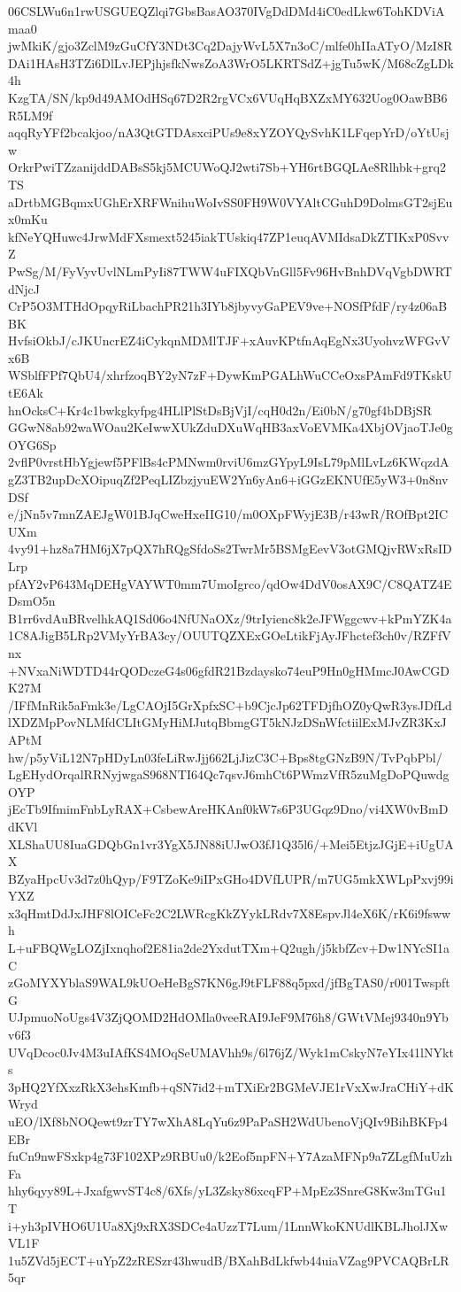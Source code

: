 06CSLWu6n1rwUSGUEQZlqi7GbsBasAO370IVgDdDMd4iC0edLkw6TohKDViAmaa0
jwMkiK/gjo3ZclM9zGuCfY3NDt3Cq2DajyWvL5X7n3oC/mlfe0hIIaATyO/MzI8R
DAi1HAsH3TZi6DlLvJEPjhjsfkNwsZoA3WrO5LKRTSdZ+jgTu5wK/M68cZgLDk4h
KzgTA/SN/kp9d49AMOdHSq67D2R2rgVCx6VUqHqBXZxMY632Uog0OawBB6R5LM9f
aqqRyYFf2bcakjoo/nA3QtGTDAsxciPUs9e8xYZOYQySvhK1LFqepYrD/oYtUsjw
OrkrPwiTZzanijddDABsS5kj5MCUWoQJ2wti7Sb+YH6rtBGQLAe8Rlhbk+grq2TS
aDrtbMGBqmxUGhErXRFWnihuWoIvSS0FH9W0VYAltCGuhD9DolmsGT2sjEux0mKu
kfNeYQHuwc4JrwMdFXsmext5245iakTUskiq47ZP1euqAVMIdsaDkZTIKxP0SvvZ
PwSg/M/FyVyvUvlNLmPyIi87TWW4uFIXQbVnGll5Fv96HvBnhDVqVgbDWRTdNjcJ
CrP5O3MTHdOpqyRiLbachPR21h3IYb8jbyvyGaPEV9ve+NOSfPfdF/ry4z06aBBK
HvfsiOkbJ/cJKUncrEZ4iCykqnMDMlTJF+xAuvKPtfnAqEgNx3UyohvzWFGvVx6B
WSblfFPf7QbU4/xhrfzoqBY2yN7zF+DywKmPGALhWuCCeOxsPAmFd9TKskUtE6Ak
hnOcksC+Kr4c1bwkgkyfpg4HLlPlStDsBjVjI/cqH0d2n/Ei0bN/g70gf4bDBjSR
GGwN8ab92waWOau2KeIwwXUkZduDXuWqHB3axVoEVMKa4XbjOVjaoTJe0gOYG6Sp
2vflP0vrstHbYgjewf5PFlBs4cPMNwm0rviU6mzGYpyL9IsL79pMlLvLz6KWqzdA
gZ3TB2upDcXOipuqZf2PeqLIZbzjyuEW2Yn6yAn6+iGGzEKNUfE5yW3+0n8nvDSf
e/jNn5v7mnZAEJgW01BJqCweHxeIIG10/m0OXpFWyjE3B/r43wR/ROfBpt2ICUXm
4vy91+hz8a7HM6jX7pQX7hRQgSfdoSs2TwrMr5BSMgEevV3otGMQjvRWxRsIDLrp
pfAY2vP643MqDEHgVAYWT0mm7UmoIgrco/qdOw4DdV0osAX9C/C8QATZ4EDsmO5n
B1rr6vdAuBRvelhkAQ1Sd06o4NfUNaOXz/9trIyienc8k2eJFWggcwv+kPmYZK4a
1C8AJigB5LRp2VMyYrBA3cy/OUUTQZXExGOeLtikFjAyJFhctef3ch0v/RZFfVnx
+NVxaNiWDTD44rQODczeG4s06gfdR21Bzdaysko74euP9Hn0gHMmcJ0AwCGDK27M
/IFfMnRik5aFmk3e/LgCAOjI5GrXpfxSC+b9CjcJp62TFDjfhOZ0yQwR3ysJDfLd
lXDZMpPovNLMfdCLItGMyHiMJutqBbmgGT5kNJzDSnWfctiilExMJvZR3KxJAPtM
hw/p5yViL12N7pHDyLn03feLiRwJjj662LjJizC3C+Bps8tgGNzB9N/TvPqbPbl/
LgEHydOrqalRRNyjwgaS968NTI64Qc7qsvJ6mhCt6PWmzVfR5zuMgDoPQuwdgOYP
jEcTb9IfmimFnbLyRAX+CsbewAreHKAnf0kW7s6P3UGqz9Dno/vi4XW0vBmDdKVl
XLShaUU8IuaGDQbGn1vr3YgX5JN88iUJwO3fJ1Q35l6/+Mei5EtjzJGjE+iUgUAX
BZyaHpcUv3d7z0hQyp/F9TZoKe9iIPxGHo4DVfLUPR/m7UG5mkXWLpPxvj99iYXZ
x3qHmtDdJxJHF8lOICeFc2C2LWRcgKkZYykLRdv7X8EspvJl4eX6K/rK6i9fswwh
L+uFBQWgLOZjIxnqhof2E81ia2de2YxdutTXm+Q2ugh/j5kbfZcv+Dw1NYcSI1aC
zGoMYXYblaS9WAL9kUOeHeBgS7KN6gJ9tFLF88q5pxd/jfBgTAS0/r001TwspftG
UJpmuoNoUgs4V3ZjQOMD2HdOMla0veeRAI9JeF9M76h8/GWtVMej9340n9Ybv6f3
UVqDcoc0Jv4M3uIAfKS4MOqSeUMAVhh9s/6l76jZ/Wyk1mCskyN7eYIx41lNYkts
3pHQ2YfXxzRkX3ehsKmfb+qSN7id2+mTXiEr2BGMeVJE1rVxXwJraCHiY+dKWryd
uEO/lXf8bNOQewt9zrTY7wXhA8LqYu6z9PaPaSH2WdUbenoVjQIv9BihBKFp4EBr
fuCn9nwFSxkp4g73F102XPz9RBUu0/k2Eof5npFN+Y7AzaMFNp9a7ZLgfMuUzhFa
hhy6qyy89L+JxafgwvST4c8/6Xfs/yL3Zsky86xcqFP+MpEz3SnreG8Kw3mTGu1T
i+yh3pIVHO6U1Ua8Xj9xRX3SDCe4aUzzT7Lum/1LnnWkoKNUdlKBLJholJXwVL1F
1u5ZVd5jECT+uYpZ2zRESzr43hwudB/BXahBdLkfwb44uiaVZag9PVCAQBrLR5qr
